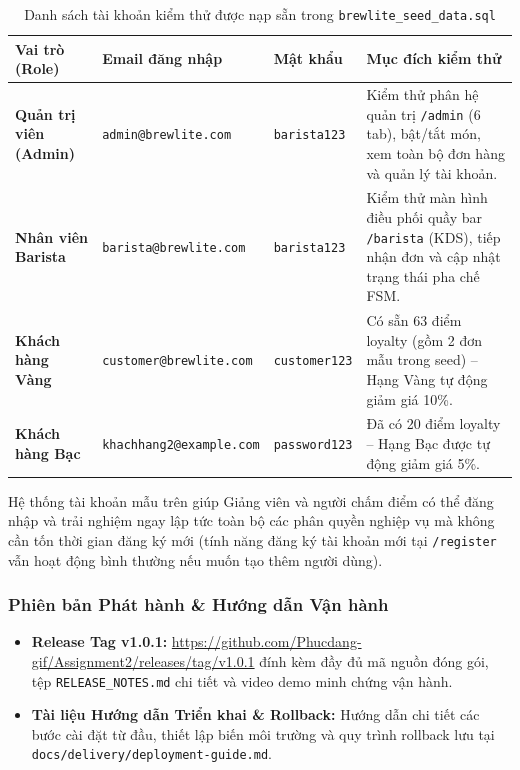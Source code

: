 \documentclass[11pt,a4paper]{article}
\begin{document}
\begin{table}[H]
\centering
\small
\renewcommand{\arraystretch}{0.92}
\begin{tabularx}{\linewidth}{|p{3.0cm}|p{4.4cm}|p{2.2cm}|Y|}
\hline
{}
\textbf{Vai trò (Role)} & \textbf{Email đăng nhập} & \textbf{Mật khẩu} & \textbf{Mục đích kiểm thử} \\ \hline
\textbf{Quản trị viên (Admin)} & \texttt{admin@brewlite.com} & \texttt{barista123} & Kiểm thử phân hệ quản trị \texttt{/admin} (6 tab), bật/tắt món, xem toàn bộ đơn hàng và quản lý tài khoản. \\ \hline
\textbf{Nhân viên Barista} & \texttt{barista@brewlite.com} & \texttt{barista123} & Kiểm thử màn hình điều phối quầy bar \texttt{/barista} (KDS), tiếp nhận đơn và cập nhật trạng thái pha chế FSM. \\ \hline
\textbf{Khách hàng Vàng} & \texttt{customer@brewlite.com} & \texttt{customer123} & Có sẵn 63 điểm loyalty (gồm 2 đơn mẫu trong seed) -- Hạng Vàng tự động giảm giá 10\%. \\ \hline
\textbf{Khách hàng Bạc} & \texttt{khachhang2@example.com} & \texttt{password123} & Đã có 20 điểm loyalty -- Hạng Bạc được tự động giảm giá 5\%. \\ \hline
\end{tabularx}
\caption{Danh sách tài khoản kiểm thử được nạp sẵn trong \texttt{brewlite\_seed\_data.sql}}
\label{tab:accounts}
\end{table}

Hệ thống tài khoản mẫu trên giúp Giảng viên và người chấm điểm có thể đăng nhập và trải nghiệm ngay lập tức toàn bộ các phân quyền nghiệp vụ mà không cần tốn thời gian đăng ký mới (tính năng đăng ký tài khoản mới tại \texttt{/register} vẫn hoạt động bình thường nếu muốn tạo thêm người dùng).
\clearpage

\subsubsection{Phiên bản Phát hành \& Hướng dẫn Vận hành}
\begin{itemize}[leftmargin=*]
    \item \textbf{Release Tag v1.0.1:} \url{https://github.com/Phucdang-gif/Assignment2/releases/tag/v1.0.1} đính kèm đầy đủ mã nguồn đóng gói, tệp \texttt{RELEASE\_NOTES.md} chi tiết và video demo minh chứng vận hành.
    \item \textbf{Tài liệu Hướng dẫn Triển khai \& Rollback:} Hướng dẫn chi tiết các bước cài đặt từ đầu, thiết lập biến môi trường và quy trình rollback lưu tại \texttt{docs/delivery/deployment-guide.md}.
\end{itemize}
\end{document}
